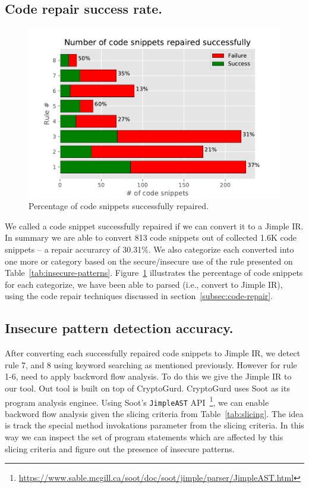 \subsection{Code repair success rate.} 
\begin{figure}[ht]
\includegraphics[width=\linewidth]{Figures/success_full_repair2.eps-eps-converted-to.pdf}
\caption{Percentage of code snippets successfully repaired.}
\label{fig:code-repair}
\end{figure}

We called a code snippet successfully repaired if we can convert it to a Jimple IR. 
In summary we are able to convert 813 code snippets out of collected 1.6K code snippets -- a repair accurarcy of 30.31\%. 
We also categorize each converted into one more or category based on the secure/insecure use of the rule presented on Table~\ref{tab:insecure-patterns}.  
Figure~\ref{fig:code-repair} 
illustrates the percentage of code snippets for each categorize, we have been able to parsed (i.e., convert to Jimple IR), 
using the code repair techniques discussed in section~\ref{subsec:code-repair}.


\subsection{Insecure pattern detection accuracy.}
After converting each successfully repaired code snippets to Jimple IR, we detect rule 7, and 8 using keyword searching as mentioned previously. However for rule 1-6, need to apply backword flow analysis. To do this we give the Jimple IR to our tool. Out tool is built on top of CryptoGurd. CryptoGurd uses Soot as its program analysis enginee. Using Soot's \texttt{JimpleAST} API~\footnote{\url{https://www.sable.mcgill.ca/soot/doc/soot/jimple/parser/JimpleAST.html}}, we can enable backword flow analysis given the slicing criteria from Table~\ref{tab:slicing}. The idea is track the special method invokations parameter from the slicing criteria. In this way we can inspect the set of program statements which are affected by this slicing criteria and figure out the presence of insecure patterns. 


